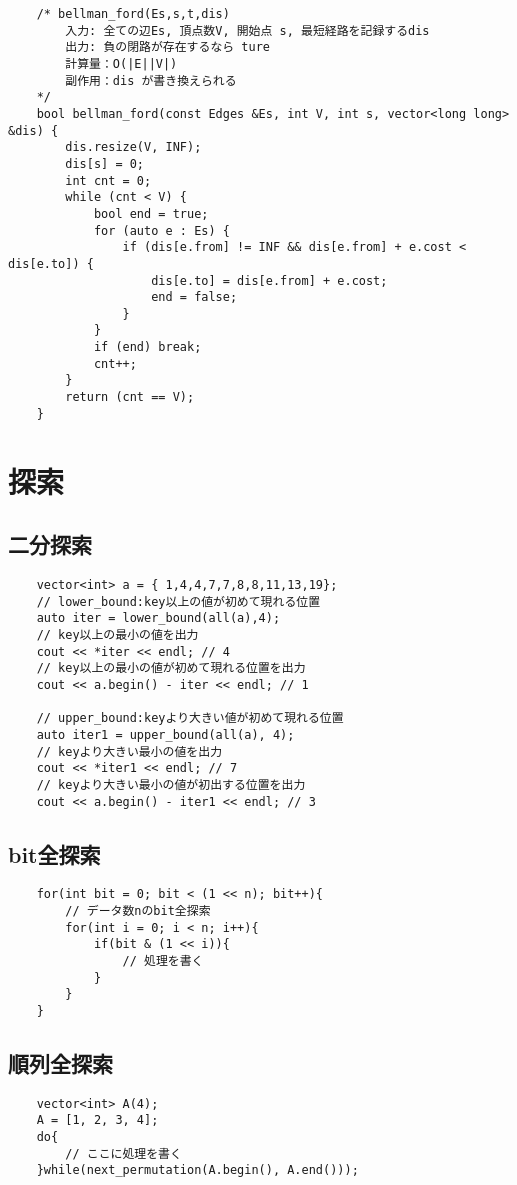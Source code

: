\documentclass[a4paper, landscape, 9pt]{jarticle} %
\begin{document}
\begin{multicols*}{3}
\begin{lstlisting}
    /* bellman_ford(Es,s,t,dis)
        入力: 全ての辺Es, 頂点数V, 開始点 s, 最短経路を記録するdis
        出力: 負の閉路が存在するなら ture
        計算量：O(|E||V|)
        副作用：dis が書き換えられる
    */
    bool bellman_ford(const Edges &Es, int V, int s, vector<long long> &dis) {
        dis.resize(V, INF);
        dis[s] = 0;
        int cnt = 0;
        while (cnt < V) {
            bool end = true;
            for (auto e : Es) {
                if (dis[e.from] != INF && dis[e.from] + e.cost < dis[e.to]) {
                    dis[e.to] = dis[e.from] + e.cost;
                    end = false;
                }
            }
            if (end) break;
            cnt++;
        }
        return (cnt == V);
    }    
    \end{lstlisting}

    \section{探索}
    \subsection{二分探索}
    \begin{lstlisting}
    vector<int> a = { 1,4,4,7,7,8,8,11,13,19};
    // lower_bound:key以上の値が初めて現れる位置
    auto iter = lower_bound(all(a),4);
    // key以上の最小の値を出力
    cout << *iter << endl; // 4
    // key以上の最小の値が初めて現れる位置を出力
    cout << a.begin() - iter << endl; // 1

    // upper_bound:keyより大きい値が初めて現れる位置
    auto iter1 = upper_bound(all(a), 4);
    // keyより大きい最小の値を出力
    cout << *iter1 << endl; // 7
    // keyより大きい最小の値が初出する位置を出力
    cout << a.begin() - iter1 << endl; // 3

    \end{lstlisting}

    \subsection{bit全探索}
    \begin{lstlisting}
    for(int bit = 0; bit < (1 << n); bit++){
        // データ数nのbit全探索
        for(int i = 0; i < n; i++){
            if(bit & (1 << i)){
                // 処理を書く
            }
        }
    }
    \end{lstlisting}

    \subsection{順列全探索}
    \begin{lstlisting}
    vector<int> A(4);
    A = [1, 2, 3, 4];
    do{
        // ここに処理を書く
    }while(next_permutation(A.begin(), A.end()));
    \end{lstlisting}



\end{multicols*}
\end{document}
